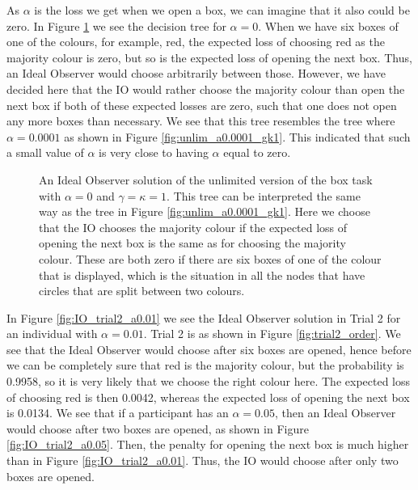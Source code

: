 As $\alpha$ is the loss we get when we open a box, we can imagine that it also could be zero. In Figure \ref{fig:unlim_a0_gk1} we see the decision tree for $\alpha=0$. When we have six boxes of one of the colours, for example, red, the expected loss of choosing red as the majority colour is zero, but so is the expected loss of opening the next box. Thus, an Ideal Observer would choose arbitrarily between those. However, we have decided here that the IO would rather choose the majority colour than open the next box if both of these expected losses are zero, such that one does not open any more boxes than necessary. We see that this tree resembles the tree where $\alpha=0.0001$ as shown in Figure \ref{fig:unlim_a0.0001_gk1}. This indicated that such a small value of $\alpha$ is very close to having $\alpha$ equal to zero. 
\begin{figure}
    \centering
    \scalebox{0.5}{}
    \caption[IO solution, unlimited. $\alpha=0$, $\gamma=\kappa=1$]{An Ideal Observer solution of the unlimited version of the box task with $\alpha = 0$ and $\gamma=\kappa=1$. This tree can be interpreted the same way as the tree in Figure \ref{fig:unlim_a0.0001_gk1}.  Here we choose that the IO chooses the majority colour if the expected loss of opening the next box is the same as for choosing the majority colour. These are both zero if there are six boxes of one of the colour that is displayed, which is the situation in all the nodes that have circles that are split between two colours.}
    \label{fig:unlim_a0_gk1}
\end{figure}

In Figure \ref{fig:IO_trial2_a0.01} we see the Ideal Observer solution in Trial 2 for an individual with $\alpha=0.01$. Trial 2 is as shown in Figure \ref{fig:trial2_order}. We see that the Ideal Observer would choose after six boxes are opened, hence before we can be completely sure that red is the majority colour, but the probability is 0.9958, so it is very likely that we choose the right colour here. The expected loss of choosing red is then 0.0042, whereas the expected loss of opening the next box is 0.0134.
We see that if a participant has an $\alpha=0.05$, then an Ideal Observer would choose after two boxes are opened, as shown in Figure \ref{fig:IO_trial2_a0.05}. Then, the penalty for opening the next box is much higher than in Figure \ref{fig:IO_trial2_a0.01}. Thus, the IO would choose after only two boxes are opened. 


